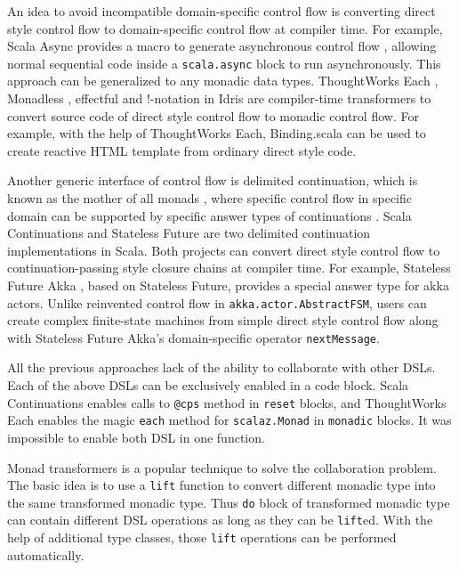 An idea to avoid incompatible domain-specific control flow is converting direct style control flow to domain-specific control flow at compiler time. For example, Scala Async provides a macro to generate asynchronous control flow \cite{haller2013sip}, allowing normal sequential code inside a \lstinline{scala.async} block to run asynchronously. This approach can be generalized to any monadic data types. ThoughtWorks Each \cite{yangbo2015each}, Monadless \cite{flavio2017monadless}, effectful \cite{crockett2013effectful} and !-notation in Idris \cite{brady2013idris} are compiler-time transformers to convert source code of direct style control flow to monadic control flow. For example, with the help of ThoughtWorks Each, Binding.scala\cite{yangbo2016binding} can be used to create reactive HTML template from ordinary direct style code.

Another generic interface of control flow is delimited continuation, which is known as the mother of all monads \cite{piponi2008mother}, where specific control flow in specific domain can be supported by specific answer types of continuations \cite{asai2007polymorphic}. Scala Continuations \cite{rompf2009implementing} and Stateless Future \cite{yangbo2014stateless} are two delimited continuation implementations in Scala. Both projects can convert direct style control flow to continuation-passing style closure chains at compiler time. For example, Stateless Future Akka \cite{yangbo2014statelessfutureakka}, based on Stateless Future, provides a special answer type for akka actors. Unlike reinvented control flow in \lstinline{akka.actor.AbstractFSM}, users can create complex finite-state machines from simple direct style control flow along with Stateless Future Akka's domain-specific operator \lstinline{nextMessage}.

All the previous approaches lack of the ability to collaborate with other DSLs. Each of the above DSLs can be exclusively enabled in a code block. Scala Continuations enables calls to \lstinline{@cps} method in \lstinline{reset} blocks, and ThoughtWorks Each enables the magic \lstinline{each} method \cite{yangbo2015each} for \lstinline{scalaz.Monad} in \lstinline{monadic} blocks. It was impossible to enable both DSL in one function.

Monad transformers \cite{liang1995monad} is a popular technique to solve the collaboration problem. The basic idea is to use a \lstinline{lift} function to convert different monadic type into the same transformed monadic type. Thus \lstinline{do} block of transformed monadic type can contain different DSL operations as long as they can be \lstinline{lift}ed. With the help of additional type classes, those \lstinline{lift} operations can be performed automatically.

